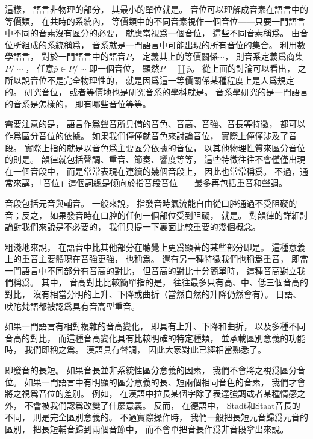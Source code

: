 這樣，
語言非物理的部分，
其最小的單位就是。
音位可以理解成音素在語言中的等價類，
在共時的系統內，
等價類中的不同音素視作一個音位——只要一門語言中不同的音素沒有區分的必要，
就應當視爲一個音位，
這些不同音素稱爲。
由音位所組成的系統稱爲，
音系就是一門語言中可能出現的所有音位的集合。
利用數學語言，
對於一門語言中的語音$P$，
定義其上的等價關係$\sim$，
則音系定義爲商集$P/\sim$，
任意$\bar{p}\in P/\sim$即一個音位，
顯然$P=\coprod\bar{p}$。
從上面的討論可以看出，
之所以說音位不是完全物理性的，
就是因爲這一等價關係某種程度上是人爲規定的。
研究音位，
或者等價地也是研究音系的學科就是。
音系學研究的是一門語言的音系是怎樣的，
即有哪些音位等等。

需要注意的是，
語言作爲聲音所具備的音色、音高、音強、音長等特徵，
都可以作爲區分音位的依據。
如果我們僅僅就音色來討論音位，
實際上僅僅涉及了音段。
實際上指的就是以音色爲主要區分依據的音位，
以其他物理性質來區分音位的則是。
韻律就包括聲調、重音、節奏、響度等等，
這些特徵往往不會僅僅出現在一個音段中，
而是常常表現在連續的幾個音段上，
因此也常常稱爲。
不過，通常來講，「音位」這個詞總是傾向於指音段音位——最多再包括重音和聲調。

音段包括元音與輔音。
一般來說，
指發音時氣流能自由從口腔通過不受阻礙的音；反之，
如果發音時在口腔的任何一個部位受到阻礙，
就是。
對韻律的詳細討論對我們來說是不必要的，
我們只提一下裏面比較重要的幾個概念。

粗淺地來說，
在語音中比其他部分在聽覺上更爲顯著的某些部分即是。
這種意義上的重音主要體現在音強更強，
也稱爲。
還有另一種特徵我們也稱爲重音，
即當一門語言中不同部分有音高的對比，
但音高的對比十分簡單時，
這種音高對立我們稱爲。
其中，
音高對比比較簡單指的是，
往往最多只有高、中、低三個音高的對比，
沒有相當分明的上升、下降或曲折（當然自然的升降仍然會有）。
日語、吠陀梵語都被認爲具有音高型重音。

如果一門語言有相對複雜的音高變化，
即具有上升、下降和曲折，
以及多種不同音高的對比，
而這種音高變化具有比較明確的特定種類，
並承載區別意義的功能時，
我們即稱之爲。
漢語具有聲調，
因此大家對此已經相當熟悉了。

即發音的長短。
如果音長並非系統性區分意義的因素，
我們不會將之視爲區分音位。
如果一門語言中有明顯的區分意義的長、短兩個相同音色的音素，
我們才會將之視爲音位的差別。
例如，
在漢語中拉長某個字除了表達強調或者某種情感之外，
不會被我們認爲改變了什麼意義。
反而，
在德語中，
Stadt和Staat音長的不同，
則是完全區別意義的。
不過實際操作時，
我們一般把長短元音歸爲元音的區別，
把長短輔音歸到兩個音節中，
而不會單把音長作爲非音段拿出來說。


